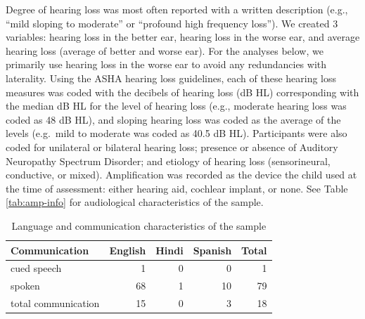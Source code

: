 \documentclass[
  english,
  man]{apa6}
\begin{document}
\begin{table}[!h]

\caption{\label{tab:amp-info}Audiological Characteristics of the Sample}
\centering
{}
\end{table}

Degree of hearing loss was most often reported with a written description (e.g., \enquote{mild sloping to moderate} or \enquote{profound high frequency loss}). We created 3 variables: hearing loss in the better ear, hearing loss in the worse ear, and average hearing loss (average of better and worse ear). For the analyses below, we primarily use hearing loss in the worse ear to avoid any redundancies with laterality. Using the ASHA hearing loss guidelines, each of these hearing loss measures was coded with the decibels of hearing loss (dB HL) corresponding with the median dB HL for the level of hearing loss (e.g., moderate hearing loss was coded as 48 dB HL), and sloping hearing loss was coded as the average of the levels (e.g.~mild to moderate was coded as 40.5 dB HL). Participants were also coded for unilateral or bilateral hearing loss; presence or absence of Auditory Neuropathy Spectrum Disorder; and etiology of hearing loss (sensorineural, conductive, or mixed). Amplification was recorded as the device the child used at the time of assessment: either hearing aid, cochlear implant, or none. See Table \ref{tab:amp-info} for audiological characteristics of the sample.

\begin{table}[!h]

\caption{\label{tab:comm-info}Language and communication characteristics of the sample}
\centering
\begin{tabular}[t]{l|r|r|r|r}
\hline
Communication & English & Hindi & Spanish & Total\\
\hline
cued speech & 1 & 0 & 0 & 1\\
\hline
spoken & 68 & 1 & 10 & 79\\
\hline
total communication & 15 & 0 & 3 & 18\\
\hline
\end{tabular}
\end{table}
\end{document}

